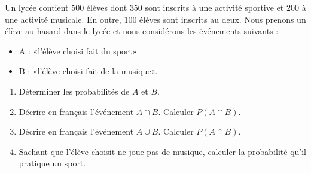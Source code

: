 
\begin{exercice}\label{exosmath-0709}

    Un lycée contient \( 500\) élèves dont \( 350\) sont inscrits à une activité sportive et \( 200\) à une activité musicale. En outre, \( 100\) élèves sont inscrits au deux. Nous prenons un élève au hasard dans le lycée et nous considérons les événements suivants :
    \begin{itemize}
        \item A : «l'élève choisi fait du sport» 
        \item B : «l'élève choisi fait de la musique».
    \end{itemize}
    \begin{enumerate}
        \item
            Déterminer les probabilités de \( A\) et \( B\).
        \item
            Décrire en français l'événement \( A\cap B\). Calculer \( P(A\cap B)\).
        \item
            Décrire en français l'événement \( A\cup B\). Calculer \( P(A\cap B)\).
        \item
            Sachant que l'élève choisit ne joue pas de musique, calculer la probabilité qu'il pratique un sport.
    \end{enumerate}

\end{exercice}
